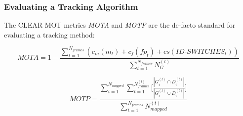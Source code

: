 \begin{frame}
\begin{columns}
		{
		}
		
		{
			\vspace{-0.7cm}
		}
	\end{columns}
\end{frame}

\begin{frame}
	\frametitle{Evaluating a Tracking Algorithm}
	
	\Large
	
	\vspace{0.3cm}
	
	The CLEAR MOT \cite{Kasturi09} metrics \emph{MOTA} and \emph{MOTP} are the de-facto
	standard for evaluating a tracking method:
	
	\vspace{0.2cm}
	
	\large
	
	\begin{equation*}
		MOTA = 1 - \frac{\sum_{t=1}^{N_{frames}} (c_m(m_t) + c_f(fp_t) + cs(ID\mbox{-}SWITCHES_t))}{\sum_{t=1}^{N_{frames}} N_G^{(t)}}
	\end{equation*}
	
	\vspace{0.4cm}
	
	\begin{equation*}
		MOTP = \frac{\sum_{i=1}^{N_{mapped}} \sum_{t=1}^{N_{frames}^{(t)}} \Big [ \frac{| G_i^{(t)} \cap D_i^{(t)} |}{| G_i^{(t)} \cup D_i^{(t)} |} \Big ] }{\sum_{t=1}^{N_{frames}} N_{mapped}^{(t)}}
	\end{equation*}
\end{frame}


